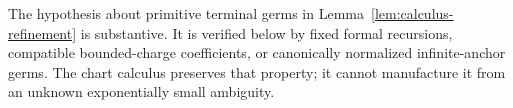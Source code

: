 The hypothesis about primitive terminal germs in
Lemma~\ref{lem:calculus-refinement} is substantive.  It is verified below
by fixed formal recursions, compatible bounded-charge coefficients, or
canonically normalized infinite-anchor germs.  The chart calculus
preserves that property; it cannot manufacture it from an unknown
exponentially small ambiguity.
